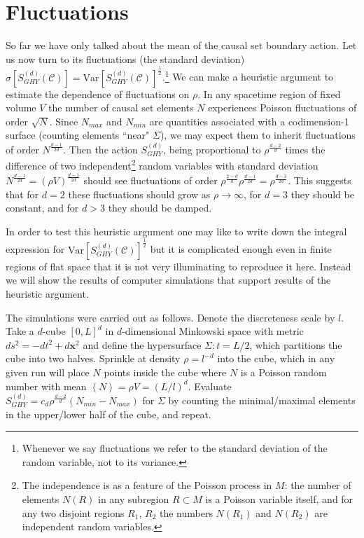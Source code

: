 \documentclass[12pt]{article}
\begin{document}
\section{Fluctuations}
So far we have only talked about the mean of the causal set boundary action. Let us now turn to its fluctuations (the standard deviation) $\sigma[S^{(d)}_{GHY}(\mathcal C)]=\text{Var}[S^{(d)}_{GHY}(\mathcal C)]^\frac12$.\footnote{Whenever we say fluctuations we refer to the standard deviation of the random variable, not to its variance.} We can make a heuristic argument to estimate the dependence of fluctuations on $\rho$. In any spacetime region of fixed volume $V$ the number of causal set elements $N$ experiences Poisson fluctuations of order $\sqrt N$. Since $N_{max}$ and $N_{min}$ are quantities associated with a codimension-1 surface (counting elements ``near" $\Sigma$), we may expect them to inherit fluctuations of order $N^\frac{d-1}{2d}$. Then the action $S^{(d)}_{GHY}$, being proportional to $\rho^\frac{d-2}{d}$ times the difference of two independent\footnote{The independence is as a feature of the Poisson process in $M$: the number of elements $N(R)$ in any subregion $R\subset M$ is a Poisson variable itself, and for any two disjoint regions $R_1$, $R_2$ the numbers $N(R_1)$ and $N(R_2)$ are independent random variables.} random variables with standard deviation $N^\frac{d-1}{2d} = (\rho V)^\frac{d-1}{2d}$ should see fluctuations of order $\rho^\frac{2-d}{d}\rho^\frac{d-1}{2d}=\rho^\frac{d-3}{2d}$. This suggests that for $d=2$ these fluctuations should grow as $\rho\rightarrow\infty$, for $d=3$ they should be constant, and for $d>3$ they should be damped.

In order to test this heuristic argument one may like to write down the integral expression for $\text{Var}[S^{(d)}_{GHY}(\mathcal C)]^\frac12$ but it is complicated enough even in finite regions of flat space that it is not very illuminating to reproduce it here. Instead we will show the results of computer simulations that support results of the heuristic argument. 
 
The simulations were carried out as follows. Denote the discreteness scale by $l$. Take a $d$-cube $[0,L]^d$ in $d$-dimensional Minkowski space with metric $ds^2=-dt^2+d{\mathbf x}^2$ and define the hypersurface $\Sigma: t=L/2$, which partitions the cube into two halves. Sprinkle at density $\rho=l^{-d}$ into the cube, which in any given run will place $N$ points inside the cube where $N$ is a Poisson random number with mean $\left\langle N\right\rangle = \rho V=  (L/l)^d$. Evaluate $S^{(d)}_{GHY}=c_d\rho^\frac{d-2}{d}(N_{min} - N_{max})$ for $\Sigma$ by counting the minimal/maximal elements in the upper/lower half of the cube, and repeat.



{}
\end{document}
